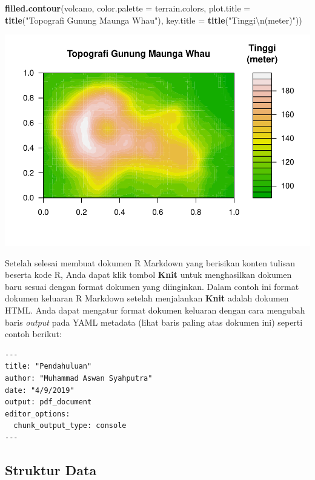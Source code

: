 \documentclass[]{article}
\newenvironment{Shaded}{\begin{snugshade}}{\end{snugshade}}
\newcommand{\CharTok}[1]{\textcolor[rgb]{0.31,0.60,0.02}{#1}}
\newcommand{\DataTypeTok}[1]{\textcolor[rgb]{0.13,0.29,0.53}{#1}}
\newcommand{\KeywordTok}[1]{\textcolor[rgb]{0.13,0.29,0.53}{\textbf{#1}}}
\newcommand{\NormalTok}[1]{#1}
\newcommand{\StringTok}[1]{\textcolor[rgb]{0.31,0.60,0.02}{#1}}
\begin{document}
\begin{Shaded}
\begin{Highlighting}[]
\KeywordTok{filled.contour}\NormalTok{(volcano,}
               \DataTypeTok{color.palette =}\NormalTok{ terrain.colors, }
               \DataTypeTok{plot.title =} \KeywordTok{title}\NormalTok{(}\StringTok{"Topografi Gunung Maunga Whau"}\NormalTok{), }
               \DataTypeTok{key.title =} \KeywordTok{title}\NormalTok{(}\StringTok{"Tinggi}\CharTok{\textbackslash{}n}\StringTok{(meter)"}\NormalTok{))}
\end{Highlighting}
\end{Shaded}

\includegraphics{001_pendahuluan_files/figure-latex/unnamed-chunk-2-1.pdf}

Setelah selesai membuat dokumen R Markdown yang berisikan konten tulisan
beserta kode R, Anda dapat klik tombol \textbf{Knit} untuk menghasilkan
dokumen baru sesuai dengan format dokumen yang diinginkan. Dalam contoh
ini format dokumen keluaran R Markdown setelah menjalankan \textbf{Knit}
adalah dokumen HTML. Anda dapat mengatur format dokumen keluaran dengan
cara mengubah baris \emph{output} pada YAML metadata (lihat baris paling
atas dokumen ini) seperti contoh berikut:

\begin{verbatim}
---
title: "Pendahuluan"
author: "Muhammad Aswan Syahputra"
date: "4/9/2019"
output: pdf_document
editor_options: 
  chunk_output_type: console
---
\end{verbatim}

\hypertarget{struktur-data}{%
\subsection{Struktur Data}\label{struktur-data}}
\end{document}
